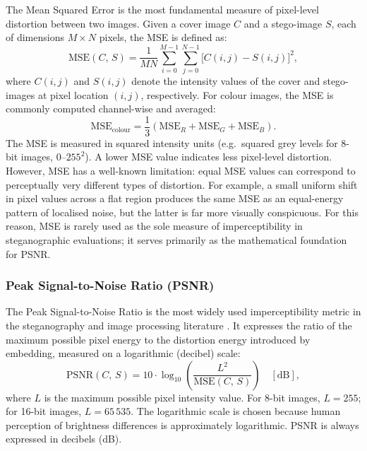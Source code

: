 \documentclass[12pt,a4paper,oneside]{report}
\begin{document}
	The Mean Squared Error is the most fundamental measure of pixel-level distortion between two
	images. Given a cover image $C$ and a stego-image $S$, each of dimensions $M \times N$ pixels,
	the MSE is defined as:
	\begin{equation}
		\mathrm{MSE}(C,\, S) = \frac{1}{MN} \sum_{i=0}^{M-1} \sum_{j=0}^{N-1}
		\bigl[ C(i,j) - S(i,j) \bigr]^2,
		\label{eq:mse}
	\end{equation}
	where $C(i,j)$ and $S(i,j)$ denote the intensity values of the cover and stego-images at pixel
	location $(i,j)$, respectively. For colour images, the MSE is commonly computed channel-wise
	and averaged:
	\begin{equation}
		\mathrm{MSE}_{\text{colour}} = \frac{1}{3} \left(
		\mathrm{MSE}_R + \mathrm{MSE}_G + \mathrm{MSE}_B
		\right).
		\label{eq:mse_colour}
	\end{equation}
	The MSE is measured in squared intensity units (e.g.\ squared grey levels for 8-bit images,
	$0$--$255^2$). A lower MSE value indicates less pixel-level distortion. However, MSE has a
	well-known limitation: equal MSE values can correspond to perceptually very different types of
	distortion. For example, a small uniform shift in pixel values across a flat region produces
	the same MSE as an equal-energy pattern of localised noise, but the latter is far more
	visually conspicuous. For this reason, MSE is rarely used as the sole measure of imperceptibility
	in steganographic evaluations; it serves primarily as the mathematical foundation for PSNR.
	
	\subsubsection{Peak Signal-to-Noise Ratio (PSNR)}
	
	The Peak Signal-to-Noise Ratio is the most widely used imperceptibility metric in the
	steganography and image processing literature \cite{gonzalez2008digital}. It expresses the
	ratio of the maximum possible pixel energy to the distortion energy introduced by embedding,
	measured on a logarithmic (decibel) scale:
	\begin{equation}
		\mathrm{PSNR}(C,\, S) = 10 \cdot \log_{10} \!\left(
		\frac{L^2}{\mathrm{MSE}(C,\, S)}
		\right) \quad [\mathrm{dB}],
		\label{eq:psnr}
	\end{equation}
	where $L$ is the maximum possible pixel intensity value. For 8-bit images, $L = 255$; for
	16-bit images, $L = 65\,535$. The logarithmic scale is chosen because human perception of
	brightness differences is approximately logarithmic. PSNR is always expressed in decibels (dB).
	
\end{document}
